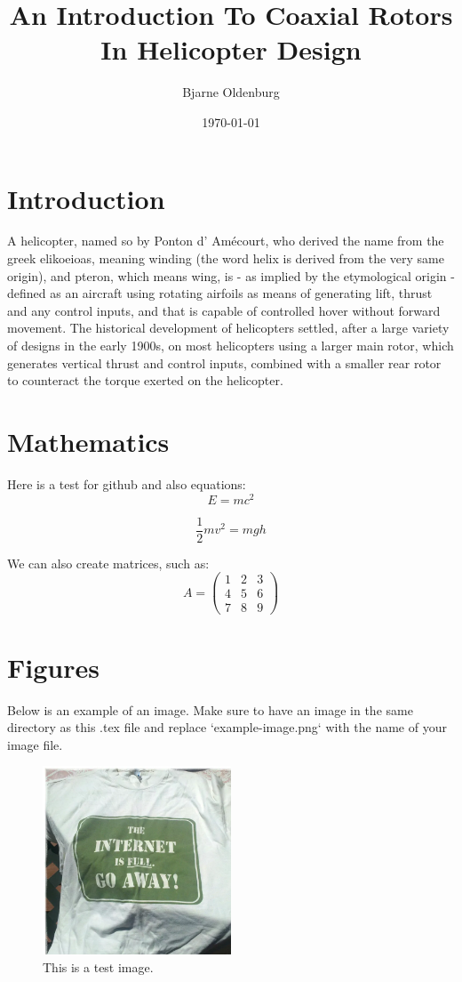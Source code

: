 \documentclass[11pt, a4paper]{scrartcl}
\title{An Introduction To Coaxial Rotors In Helicopter Design}
\author{Bjarne Oldenburg}
\date{\today}
\begin{document}
\maketitle

\section{Introduction}
A helicopter, named so by Ponton d' Amécourt, who derived the name from the greek elikoeioas, meaning winding (the word helix is derived from the very same origin), 
and pteron, which means wing, is - as implied by the etymological origin - defined as an aircraft using rotating airfoils as means of generating lift, thrust and any control inputs, and that is capable of controlled hover without forward movement.
The historical development of helicopters settled, after a large variety of designs in the early 1900s, on most helicopters using a larger main rotor, 
which generates vertical thrust and control inputs, combined with a smaller rear rotor to counteract the torque exerted on the helicopter.

\section{Mathematics}
Here is a test for github and also equations:
\begin{equation}
    E = mc^2
\end{equation}

\begin{equation}
    \frac{1}{2}mv^2 = mgh
\end{equation} 

We can also create matrices, such as:
\[
    A = \begin{pmatrix}
    1 & 2 & 3 \\
    4 & 5 & 6 \\
    7 & 8 & 9
    \end{pmatrix}
\]

\section{Figures}
Below is an example of an image. Make sure to have an image in the same directory as this .tex file and replace `example-image.png` with the name of your image file.

\begin{figure}[!ht]
    \centering
    \includegraphics[width=0.5\textwidth]{test.png}
    \caption{This is a test image.}
    \label{fig:testimage}
\end{figure}
\end{document}
